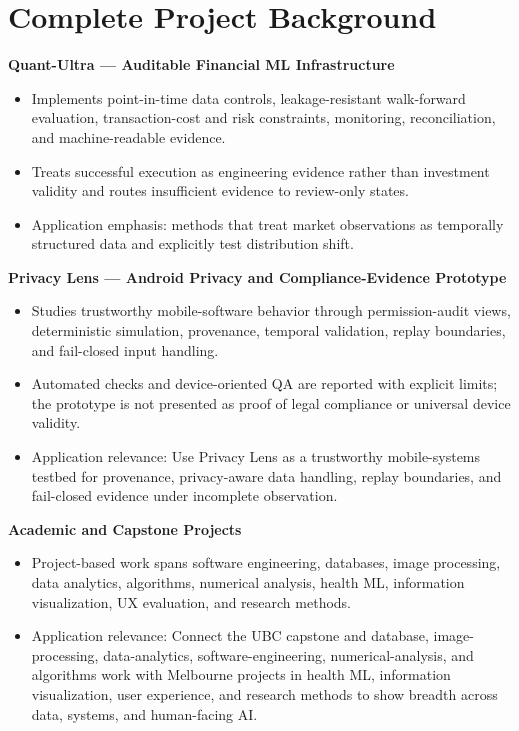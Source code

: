 \documentclass[11pt]{article}
\begin{document}
\section*{Complete Project Background}
\textbf{Quant-Ultra --- Auditable Financial ML Infrastructure}
\begin{itemize}
\item Implements point-in-time data controls, leakage-resistant walk-forward evaluation, transaction-cost and risk constraints, monitoring, reconciliation, and machine-readable evidence.
\item Treats successful execution as engineering evidence rather than investment validity and routes insufficient evidence to review-only states.
\item Application emphasis: methods that treat market observations as temporally structured data and explicitly test distribution shift.
\end{itemize}

\textbf{Privacy Lens --- Android Privacy and Compliance-Evidence Prototype}
\begin{itemize}
\item Studies trustworthy mobile-software behavior through permission-audit views, deterministic simulation, provenance, temporal validation, replay boundaries, and fail-closed input handling.
\item Automated checks and device-oriented QA are reported with explicit limits; the prototype is not presented as proof of legal compliance or universal device validity.
\item Application relevance: Use Privacy Lens as a trustworthy mobile-systems testbed for provenance, privacy-aware data handling, replay boundaries, and fail-closed evidence under incomplete observation.
\end{itemize}

\textbf{Academic and Capstone Projects}
\begin{itemize}
\item Project-based work spans software engineering, databases, image processing, data analytics, algorithms, numerical analysis, health ML, information visualization, UX evaluation, and research methods.
\item Application relevance: Connect the UBC capstone and database, image-processing, data-analytics, software-engineering, numerical-analysis, and algorithms work with Melbourne projects in health ML, information visualization, user experience, and research methods to show breadth across data, systems, and human-facing AI.
\end{itemize}
\end{document}
